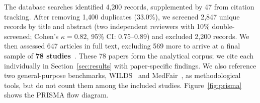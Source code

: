 \label{sec:methods:selection}
The database searches identified 4{,}200 records, supplemented by 47
from citation tracking. After removing 1{,}400 duplicates (33.0\%), we screened 2{,}847 unique records by title and abstract (two independent reviewers with 10\%
double-screened; Cohen's $\kappa=0.82$, 95\% CI: 0.75--0.89) and excluded 2{,}200 records. We then assessed 647 articles in full text, excluding 569 more to arrive at a
final sample of \textbf{78 studies}~\citep{montezuma2025unbiased,
riccilara2022addressing, chen2023algorithmic, yang2024survey}.
These 78 papers form the analytical corpus; we cite each
individually in Section~\ref{sec:results} with paper-specific
findings. We also reference two general-purpose benchmarks,
WILDS~\citep{koh2021wilds} and MedFair~\citep{zong2023medfair},
as methodological tools, but do not count them among the
included studies. Figure~\ref{fig:prisma} shows the PRISMA flow diagram.

